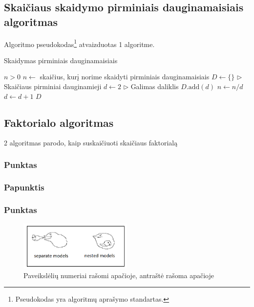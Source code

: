 \documentclass[]{VUMIFTemplateClass}
\begin{document}
\subsection{Skaičiaus skaidymo pirminiais dauginamaisiais algoritmas}

Algoritmo pseudokodas{\footnote{Pseudokodas yra algoritmų aprašymo standartas.}
} atvaizduotas 1 algoritme.

\begin{algorithm}[h!]
\caption{Skaidymas pirminiais dauginamaisiais}\label{alg:prime_factorization}
\begin{algorithmic}[1]
    \REQUIRE $n > 0$
    \STATE $n \gets$ skaičius, kurį norime skaidyti pirminiais dauginamaisiais
    \STATE $D \gets \{\}$ \hfill $\triangleright$ Skaičiaus pirminiai dauginamieji
    \STATE $d \gets 2$ \hfill $\triangleright$ Galimas daliklis
            \STATE $D.\text{add}(d)$
            \STATE $n \gets n / d$
        \ELSE
            \STATE $d \gets d + 1$
        \ENDIF
    \ENDWHILE
    \RETURN $D$
\end{algorithmic}
\end{algorithm}




\newpage
\subsection{Faktorialo algoritmas}
2 algoritmas parodo, kaip suskaičiuoti skaičiaus faktorialą
\subsubsection{Punktas}
\subsubsection{Papunktis}
\subsubsection{Punktas}
\begin{figure}[H]
    \centering
    \includegraphics[width=0.5\textwidth]{images/AIC.png}
    \caption{Paveikslėlių numeriai rašomi apačioje, antraštė rašoma apačioje}
    \label{fig:grafikas1}
\end{figure}
\end{document}
